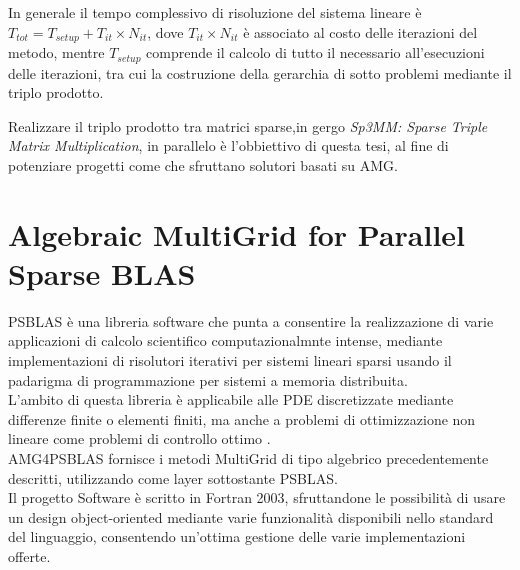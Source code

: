 In generale il tempo complessivo di risoluzione del sistema lineare è $T_{tot} = T_{setup} + T_{it}\times N_{it}$,
dove $T_{it}\times N_{it}$ è associato al costo delle iterazioni del metodo, 
mentre $T_{setup}$ comprende il calcolo di tutto il necessario all'esecuzioni delle iterazioni,
tra cui la costruzione della gerarchia di sotto problemi mediante il triplo prodotto.\\ %
\par\null\par
Realizzare il triplo prodotto tra matrici sparse,in gergo \emph{Sp3MM: Sparse Triple Matrix Multiplication},  
in parallelo è l'obbiettivo di questa tesi, al fine di potenziare progetti come \cite{AMG4PSBLAS} che sfruttano solutori basati su AMG.\\
\section{Algebraic MultiGrid for Parallel Sparse BLAS}
PSBLAS è una libreria software che punta a consentire la realizzazione di varie applicazioni di calcolo scientifico computazionalmnte intense,
mediante implementazioni di risolutori iterativi per sistemi lineari sparsi 
usando il padarigma di programmazione per sistemi a memoria distribuita.\\
L'ambito di questa libreria è applicabile alle PDE discretizzate mediante differenze finite o elementi finiti,
ma anche a problemi di ottimizzazione non lineare come problemi di controllo ottimo \cite{PSBLAS3man}.\\
AMG4PSBLAS \cite{AMG4PSBLASman} fornisce i metodi MultiGrid di tipo algebrico precedentemente descritti,
utilizzando come layer sottostante PSBLAS.\\
Il progetto Software è scritto in Fortran 2003, sfruttandone le possibilità di 
usare un design object-oriented mediante varie funzionalità disponibili nello standard del linguaggio,
consentendo un'ottima gestione delle varie implementazioni offerte. 
